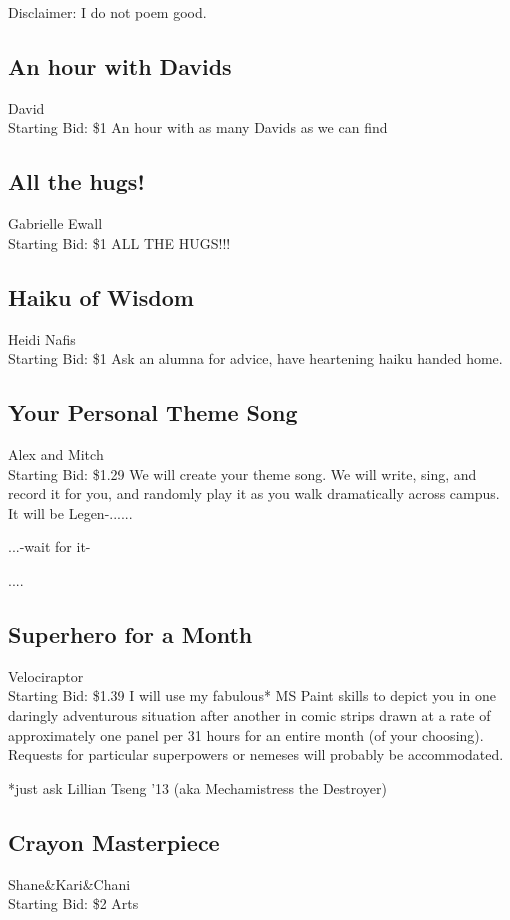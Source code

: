 \documentclass[11pt]{article}
\begin{document}
Disclaimer: I do not poem good.
\subsection{An hour with Davids}
David
\\
Starting Bid: \$1
\newline
An hour with as many Davids as we can find
\subsection{All the hugs!}
Gabrielle Ewall
\\
Starting Bid: \$1
\newline
ALL THE HUGS!!!
\subsection{Haiku of Wisdom}
Heidi Nafis
\\
Starting Bid: \$1
\newline
Ask an alumna for advice, have heartening haiku handed home.
\subsection{Your Personal Theme Song}
Alex and Mitch
\\
Starting Bid: \$1.29
\newline
We will create your theme song. We will write, sing, and record it for you, and randomly play it as you walk dramatically across campus. It will be Legen-......


...-wait for it-



....
\subsection{Superhero for a Month}
Velociraptor
\\
Starting Bid: \$1.39
\newline
I will use my fabulous* MS Paint skills to depict you in one daringly adventurous situation after another in comic strips drawn at a rate of approximately one panel per 31 hours for an entire month (of your choosing).  Requests for particular superpowers or nemeses will probably be accommodated.

*just ask Lillian Tseng ’13 (aka Mechamistress the Destroyer)
\subsection{Crayon Masterpiece}
Shane\&Kari\&Chani
\\
Starting Bid: \$2
\newline
Arts
\end{document}
